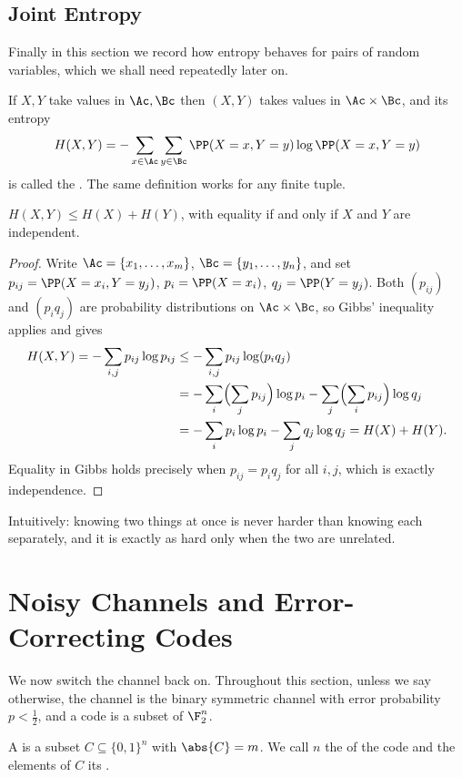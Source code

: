 \subsection{Joint Entropy}

Finally in this section we record how entropy behaves for pairs of random variables, which we shall need repeatedly later on.

If $X, Y$ take values in $\Ac, \Bc$ then $(X,Y)$ takes values in $\Ac \times \Bc$, and its entropy
$$H(X,Y) = -\sum_{x \in \Ac}\sum_{y \in \Bc} \PP(X = x, Y=y)\log \PP(X=x,Y=y)$$
is called the . The same definition works for any finite tuple.

\begin{lemma}[Subadditivity]\label{lem:subadd}
	$H(X,Y) \le H(X) + H(Y)$, with equality if and only if $X$ and $Y$ are independent.
\end{lemma}

\begin{proof}
	Write $\Ac = \{x_1, \dots, x_m\}$, $\Bc = \{y_1, \dots, y_n\}$, and set $p_{ij} = \PP(X = x_i, Y = y_j)$, $p_i = \PP(X = x_i)$, $q_j = \PP(Y = y_j)$. Both $(p_{ij})$ and $(p_iq_j)$ are probability distributions on $\Ac \times \Bc$, so Gibbs' inequality applies and gives
	\begin{align*}
		H(X,Y) = -\sum_{i,j} p_{ij}\log p_{ij} &\le -\sum_{i,j}p_{ij}\log(p_iq_j) \\
		&= -\sum_i \Bigl(\sum_j p_{ij}\Bigr)\log p_i - \sum_j \Bigl(\sum_i p_{ij}\Bigr)\log q_j \\
		&= -\sum_i p_i \log p_i - \sum_j q_j \log q_j = H(X) + H(Y).
	\end{align*}
	Equality in Gibbs holds precisely when $p_{ij} = p_iq_j$ for all $i,j$, which is exactly independence.
\end{proof}

Intuitively: knowing two things at once is never harder than knowing each separately, and it is exactly as hard only when the two are unrelated.


\section{Noisy Channels and Error-Correcting Codes}

We now switch the channel back on. Throughout this section, unless we say otherwise, the channel is the binary symmetric channel with error probability $p < \tfrac12$, and a code is a subset of $\F_2^n$.

\begin{definition}
	A  is a subset $C \subseteq \{0,1\}^n$ with $\abs{C} = m$. We call $n$ the  of the code and the elements of $C$ its .
\end{definition}

